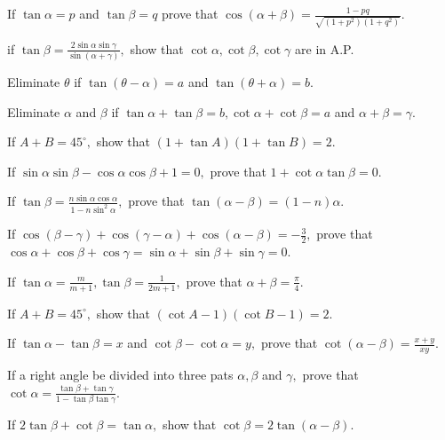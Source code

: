 \item If $\tan\alpha = p$ and $\tan\beta = q$ prove that $\cos(\alpha + \beta) = \frac{1 - pq}{\sqrt{(1 + p^2)(1 +
    q^2)}}$.

\item if $\tan \beta = \frac{2\sin\alpha\sin\gamma}{\sin(\alpha + \gamma)},$ show that $\cot\alpha, \cot\beta,
    \cot\gamma$ are in A.P.

\item Eliminate $\theta$ if $\tan(\theta - \alpha) = a$ and $\tan(\theta + \alpha) = b$.

\item Eliminate $\alpha$ and $\beta$ if $\tan\alpha + \tan\beta = b, \cot\alpha + \cot\beta = a$ and
    $\alpha + \beta = \gamma$.

\item If $A + B = 45^\circ,$ show that $(1 + \tan A)(1 + \tan B) = 2$.

\item If $\sin\alpha\sin\beta - \cos\alpha\cos\beta + 1 = 0,$ prove that $1 + \cot\alpha\tan\beta = 0$.

\item If $\tan\beta = \frac{n\sin\alpha\cos\alpha}{1 - n\sin^2\alpha},$ prove that $\tan(\alpha - \beta) = (1 - n)\alpha$.

\item If $\cos(\beta - \gamma) + \cos(\gamma - \alpha) + \cos(\alpha - \beta) = -\frac{3}{2},$ prove that $\cos\alpha +
    \cos\beta + \cos\gamma = \sin\alpha + \sin\beta + \sin\gamma = 0$.

\item If $\tan\alpha = \frac{m}{m + 1}, \tan\beta = \frac{1}{2m + 1},$ prove that $\alpha + \beta = \frac{\pi}{4}$.

\item If $A + B = 45^\circ,$ show that $(\cot A - 1)(\cot B - 1) = 2$.

\item If $\tan\alpha - \tan\beta = x$ and $\cot\beta - \cot\alpha = y,$ prove that $\cot(\alpha - \beta) =
    \frac{x + y}{xy}$.

\item If a right angle be divided into three pats $\alpha, \beta$ and $\gamma,$ prove that $\cot\alpha =
    \frac{\tan\beta + \tan\gamma}{1 - \tan\beta\tan\gamma}$.

\item If $2\tan\beta + \cot \beta = \tan\alpha,$ show that $\cot \beta = 2\tan(\alpha - \beta)$.

